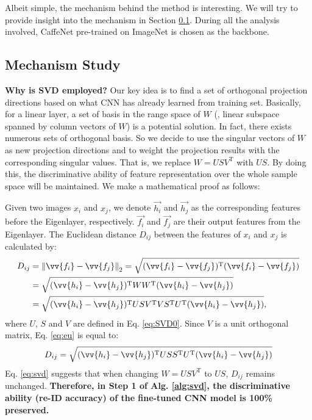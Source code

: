 \documentclass[10pt,twocolumn,letterpaper]{article}
\begin{document}
Albeit simple, the mechanism behind the method is interesting. We will try to provide insight into the mechanism in Section \ref{sec:mechanism}. During all the analysis involved, CaffeNet pre-trained on ImageNet is chosen as the backbone. 

\subsection{Mechanism Study} \label{sec:mechanism}


\textbf{Why is SVD employed?} 
Our key idea is to find a set of orthogonal projection directions based on what CNN has already learned from training set. Basically, for a linear layer, a set of basis in the range space of $W$ (\ie, linear subspace spanned by column vectors of $W$) is a potential solution. In fact, there exists numerous sets of orthogonal basis. So we decide to use the singular vectors of $W$ as new projection directions and to weight the projection results with the corresponding singular values. That is, we replace \(W=USV^\mathrm{T}\) with \(US\). By doing this, {the discriminative ability  of feature representation over the whole sample space will be maintained}. We make a mathematical proof as follows:

Given two images \(x_i\) and \(x_j\), we denote $\vec{h_i}$ and $\vec{h_j}$ as the corresponding features  before the Eigenlayer, respectively. $\vec{f_i}$ and $\vec{f_j}$ are their output features from the Eigenlayer. The Euclidean distance \(D_{ij}\) between the features of \(x_i\) and \(x_j\) is calculated by:
{\setlength\abovedisplayskip{5pt}
\setlength\belowdisplayskip{7pt}
\begin{align}
D_{ij}&={\Vert\vv{f_i}-\vv{f_j}\Vert}_{2}=\sqrt{(\vv{f_i}-\vv{f_j})^\mathrm{T}(\vv{f_i}-\vv{f_j})}\nonumber\\
&=\sqrt{(\vv{h_i}-\vv{h_j})^\mathrm{T}WW^\mathrm{T}(\vv{h_i}-\vv{h_j})}\nonumber\\
&=\sqrt{(\vv{h_i}-\vv{h_j})^\mathrm{T}USV^\mathrm{T}VS^\mathrm{T}U^\mathrm{T}(\vv{h_i}-\vv{h_j})},
\label{eq:eu}
\end{align}
}where $U$, $S$ and $V$ are defined in Eq. \ref{eq:SVD0}. Since $V$ is a unit orthogonal matrix, Eq. \ref{eq:eu} is equal to:
\begin{equation}D_{ij}=\sqrt{(\vv{h_i}-\vv{h_j})^\mathrm{T}USS^\mathrm{T}U^\mathrm{T}(\vv{h_i}-\vv{h_j})}
\label{eq:svd}
\end{equation}
Eq. \ref{eq:svd} suggests that when changing $W=USV^\mathrm{T}$ to $US$, $D_{ij}$ remains unchanged. \textbf{Therefore, in Step 1 of Alg. \ref{alg:svd}, the discriminative ability (re-ID accuracy) of the fine-tuned CNN model is 100\% preserved.}
\end{document}
